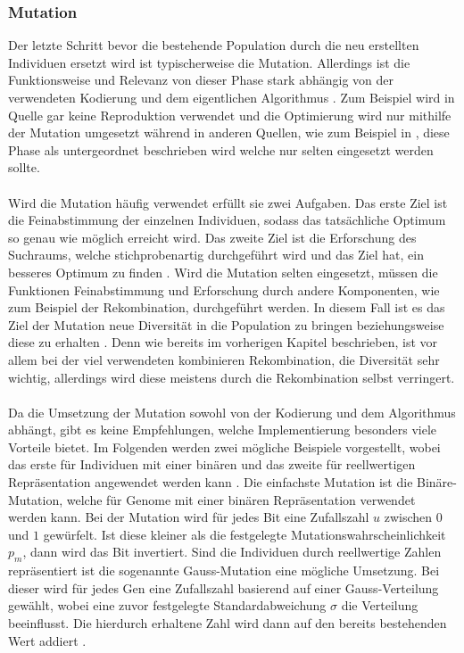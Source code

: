 \subsubsection{Mutation}
Der letzte Schritt bevor die bestehende Population durch die neu erstellten Individuen ersetzt wird ist typischerweise die Mutation. Allerdings ist die Funktionsweise und Relevanz von dieser Phase stark abhängig von der verwendeten Kodierung und dem eigentlichen Algorithmus \cite{weicker2015evolutionare}. Zum Beispiel wird in Quelle \cite{such2017deep} gar keine Reproduktion verwendet und die Optimierung wird nur mithilfe der Mutation umgesetzt während in anderen Quellen, wie zum Beispiel in \cite{zoller2007kunstliche}, diese Phase als untergeordnet beschrieben wird welche nur selten eingesetzt werden sollte.
\\\\
Wird die Mutation häufig verwendet erfüllt sie zwei Aufgaben. Das erste Ziel ist die Feinabstimmung der einzelnen Individuen, sodass das tatsächliche Optimum so genau wie möglich erreicht wird. Das zweite Ziel ist die Erforschung des Suchraums, welche stichprobenartig durchgeführt wird und das Ziel hat, ein besseres Optimum zu finden \cite{weicker2015evolutionare}.  Wird die Mutation selten eingesetzt, müssen die Funktionen Feinabstimmung und Erforschung durch andere Komponenten, wie zum Beispiel der Rekombination, durchgeführt werden. In diesem Fall ist es das Ziel der Mutation neue Diversität in die Population zu bringen beziehungsweise diese zu erhalten \cite{weicker2015evolutionare}. Denn wie bereits im vorherigen Kapitel beschrieben, ist vor allem bei der viel verwendeten kombinieren Rekombination, die Diversität sehr wichtig, allerdings wird diese meistens durch die Rekombination selbst verringert.
\\\\
Da die Umsetzung der Mutation sowohl von der Kodierung und dem Algorithmus abhängt, gibt es keine Empfehlungen, welche Implementierung besonders viele Vorteile bietet. Im Folgenden werden zwei mögliche Beispiele vorgestellt, wobei das erste für Individuen mit einer binären und das zweite für reellwertigen Repräsentation angewendet werden kann \cite{weicker2015evolutionare}. Die einfachste Mutation ist die Binäre-Mutation, welche für Genome mit einer binären Repräsentation verwendet werden kann. Bei der Mutation wird für jedes Bit eine Zufallszahl $u$ zwischen $0$ und $1$ gewürfelt. Ist diese kleiner als die festgelegte Mutationswahrscheinlichkeit $p_m$, dann wird das Bit invertiert. Sind die Individuen durch reellwertige Zahlen repräsentiert ist die sogenannte Gauss-Mutation eine mögliche Umsetzung. Bei dieser wird für jedes Gen eine Zufallszahl basierend auf einer Gauss-Verteilung gewählt, wobei eine zuvor festgelegte Standardabweichung $\sigma$ die Verteilung beeinflusst. Die hierdurch erhaltene Zahl wird dann auf den bereits bestehenden Wert addiert \cite{weicker2015evolutionare}.

